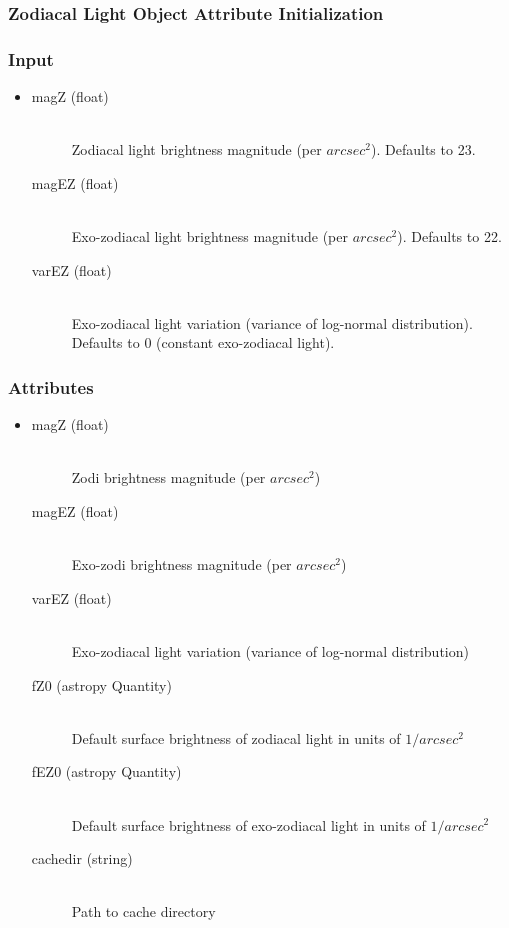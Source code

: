\documentclass[cleanfoot]{asme2ej}
\begin{document}
\subsubsection{Zodiacal Light Object Attribute Initialization}

\subsubsection*{Input}
\begin{itemize}
\item
\begin{description}
    \item[magZ (float)] \hfill \\ Zodiacal light brightness magnitude (per $ arcsec^2 $). Defaults to 23.
    \item[magEZ (float)] \hfill \\ Exo-zodiacal light brightness magnitude (per $ arcsec^2 $). Defaults to 22.
    \item[varEZ (float)] \hfill \\ Exo-zodiacal light variation (variance of log-normal distribution). Defaults to 0 (constant exo-zodiacal light).
\end{description}
\end{itemize}

\subsubsection*{Attributes}
\begin{itemize}
\item
\begin{description}
    \item[magZ (float)] \hfill \\ Zodi brightness magnitude (per $ arcsec^2 $)
    \item[magEZ (float)] \hfill \\ Exo-zodi brightness magnitude (per $ arcsec^2 $)
    \item[varEZ (float)] \hfill \\ Exo-zodiacal light variation (variance of log-normal distribution)
    \item[fZ0 (astropy Quantity)] \hfill \\ Default surface brightness of zodiacal light in units of $ 1/arcsec^2 $ 
    \item[fEZ0 (astropy Quantity)] \hfill \\ Default surface brightness of exo-zodiacal light in units of $ 1/arcsec^2 $ 
    \item[cachedir (string)] \hfill \\ Path to cache directory
\end{description}
\end{itemize}
\end{document}
